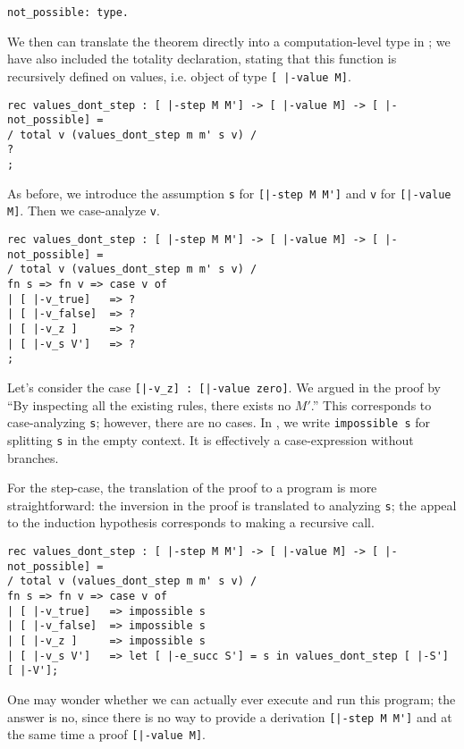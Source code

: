 \begin{lstlisting}
not_possible: type.
\end{lstlisting}

We then can translate the theorem directly into a computation-level type in
\beluga; we have also included the totality  declaration, stating that this
function is recursively defined on values, i.e. object of type \lstinline![ |-value M]!.

\begin{lstlisting}
rec values_dont_step : [ |-step M M'] -> [ |-value M] -> [ |-not_possible] =
/ total v (values_dont_step m m' s v) /
?
;
\end{lstlisting}

As before, we introduce the assumption \lstinline!s! for
\lstinline![|-step M M']! and \lstinline!v! for
\lstinline![|-value M]!. Then we case-analyze \lstinline!v!.

\begin{lstlisting}
rec values_dont_step : [ |-step M M'] -> [ |-value M] -> [ |-not_possible] =
/ total v (values_dont_step m m' s v) /
fn s => fn v => case v of
| [ |-v_true]   => ?
| [ |-v_false]  => ?
| [ |-v_z ]     => ?
| [ |-v_s V']   => ?
;
\end{lstlisting}

Let's consider the case \lstinline![|-v_z] : [|-value zero]!. We argued in the
proof by ``By inspecting all the existing rules, there exists no $M'$.'' This
corresponds to case-analyzing \lstinline!s!; however, there are no cases. In
\beluga, we write \lstinline!impossible s! for splitting \lstinline!s! in
the empty context. It is effectively a case-expression without branches.

For the step-case, the translation of the proof to a program is more
straightforward: the inversion in the proof is translated to analyzing
\lstinline!s!; the appeal to the induction hypothesis corresponds to making a
recursive call.

\begin{lstlisting}
rec values_dont_step : [ |-step M M'] -> [ |-value M] -> [ |-not_possible] =
/ total v (values_dont_step m m' s v) /
fn s => fn v => case v of
| [ |-v_true]   => impossible s 
| [ |-v_false]  => impossible s 
| [ |-v_z ]     => impossible s 
| [ |-v_s V']   => let [ |-e_succ S'] = s in values_dont_step [ |-S'] [ |-V'];
\end{lstlisting}

One may wonder whether we can actually ever execute and run this program; the
answer is no, since there is no way to provide a derivation
\lstinline![|-step M M']! and at the same time a proof \lstinline![|-value M]!.


